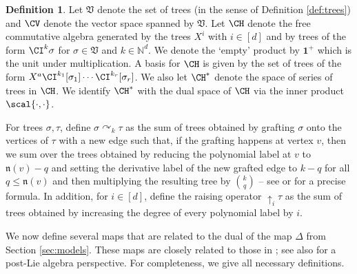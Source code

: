 \documentclass[11pt,a4paper]{article}
\numberwithin{equation}{section}
\theoremstyle{definition}
\newtheorem{definition}[theorem]{Definition}
\theoremstyle{remark}
\def\N{{\mathbb N}}
\newcommand{\bone}{\mathbf{1}}
\newcommand{\mfn}{\mathfrak{n}}
\newcommand{\mfV}{\mathfrak{V}}
\begin{document}
\begin{definition}
Let $\mfV$ denote the set of trees (in the sense of Definition \ref{def:trees}) and $\CV$ denote the vector space spanned by $\mfV$.
Let $\CH$ denote the free commutative algebra generated by the trees $X^i$ with $i\in[d]$ and by trees of the form $\CI^{k}\sigma$ for $\sigma \in\mfV$ and $k\in\N^d$.
We denote the `empty' product by $\bone^+$ which is the unit under multiplication.
A basis for $\CH$ is given by the set of trees of the form $X^a\CI^{k_1}[\sigma_1]\cdots\CI^{k_r}[\sigma_r]$.
We also let $\CH^*$ denote the space of series of trees in $\CH$.
We identify $\CH^*$ with the dual space of $\CH$ via the inner product $\scal{\cdot,\cdot}$.
\end{definition}

For trees $\sigma,\tau$, define $\sigma \curvearrowright_k \tau$ as the sum of trees obtained by grafting $\sigma$ onto the vertices of $\tau$ with a new edge such that, if the grafting happens at vertex $v$, then we sum over the trees obtained by reducing the polynomial label at $v$ to $\mfn(v)-q$ and setting the derivative label of the new grafted edge to $k-q$ for all $q \leq \mfn(v)$ and then multiplying the resulting tree by $\binom{k}{q}$ -- see \cite[Remark~4.12]{BCCH21} or \cite[Eq.~(4.26)]{ESI_lectures} for a precise formula.
In addition, for $i\in[d]$, define the raising operator $\uparrow_i \tau$ as the sum of trees obtained by increasing the degree of every polynomial label by $i$.

We now define several maps that are related to the dual of the map $\Delta$ from Section \ref{sec:models}. These maps are closely related to those in \cite{Bruned_Manchon_23_deform}; see also \cite{Bruned_Katsetsiadis_23_post_Lie} for a post-Lie algebra perspective.
For completeness, we give all necessary definitions.
\end{document}
